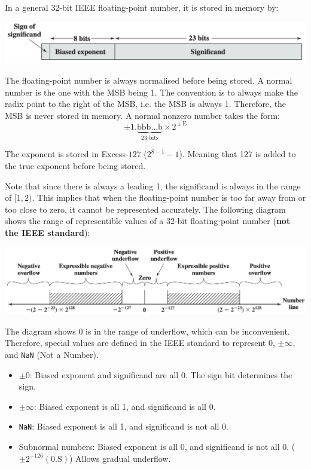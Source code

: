 In a general 32-bit IEEE floating-point number, it is stored in memory by:

\begin{center}
    \includegraphics[scale=0.5]{chaps/number-representation/32-bit-ieee-float.png}
\end{center}

The floating-point number is always normalised before being stored. A normal number is the one
with the MSB being 1. The convention is to always make the radix point to the right of the MSB,
i.e. the MSB is always 1. Therefore, the MSB is never stored in memory. A normal nonzero number
takes the form:
\[\pm 1.\underbrace{\text{bbb}\ldots\text{b}}_{\text{23 bits}}\times 2^{\,\pm\,\text{E}}\]

The exponent is stored in Excess-$127$ ($2^{8-1} - 1$). Meaning that 127 is added to the true
exponent before being stored.

Note that since there is always a leading 1, the significand is always in the range of $[1, 2)$.
This implies that when the floating-point number is too far away from or too close to zero, it
cannot be represented accurately. The following diagram shows the range of representible values
of a 32-bit floating-point number (\textbf{not the IEEE standard}):

\begin{center}
    \includegraphics[scale=0.5]{chaps/number-representation/32-bit-ieee-float-range.png}
\end{center}

The diagram shows 0 is in the range of underflow, which can be inconvenient. Therefore, special
values are defined in the IEEE standard
to represent 0, $\pm\infty$, and \texttt{NaN} (Not a Number).
\begin{itemize}
    \item $\pm0$: Biased exponent and significand are all 0. The sign bit determines the sign.
    \item $\pm\infty$: Biased exponent is all 1, and significand is all 0.
    \item \texttt{NaN}: Biased exponent is all 1, and significand is not all 0.
    \item Subnormal numbers: Biased exponent is all 0, and significand is not all 0.
        ($\pm 2^{-126}(0.\text{S})$) Allows gradual underflow.
\end{itemize}

